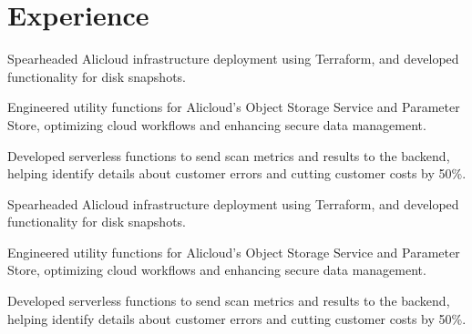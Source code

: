\section{Experience}

\begin{resumeItem}
\begin{resumeList}
    \item Spearheaded Alicloud infrastructure deployment using Terraform, and developed functionality for disk snapshots.
    \item Engineered utility functions for Alicloud's Object Storage Service and Parameter Store, optimizing cloud workflows and enhancing secure data management.
    \item Developed serverless functions to send scan metrics and results to the backend, helping identify details about customer errors and cutting customer costs by 50\%.
\end{resumeList}
\end{resumeItem}

\begin{resumeItem}
\begin{resumeList}
    \item Spearheaded Alicloud infrastructure deployment using Terraform, and developed functionality for disk snapshots.
    \item Engineered utility functions for Alicloud's Object Storage Service and Parameter Store, optimizing cloud workflows and enhancing secure data management.
    \item Developed serverless functions to send scan metrics and results to the backend, helping identify details about customer errors and cutting customer costs by 50\%.
\end{resumeList}
\end{resumeItem}

